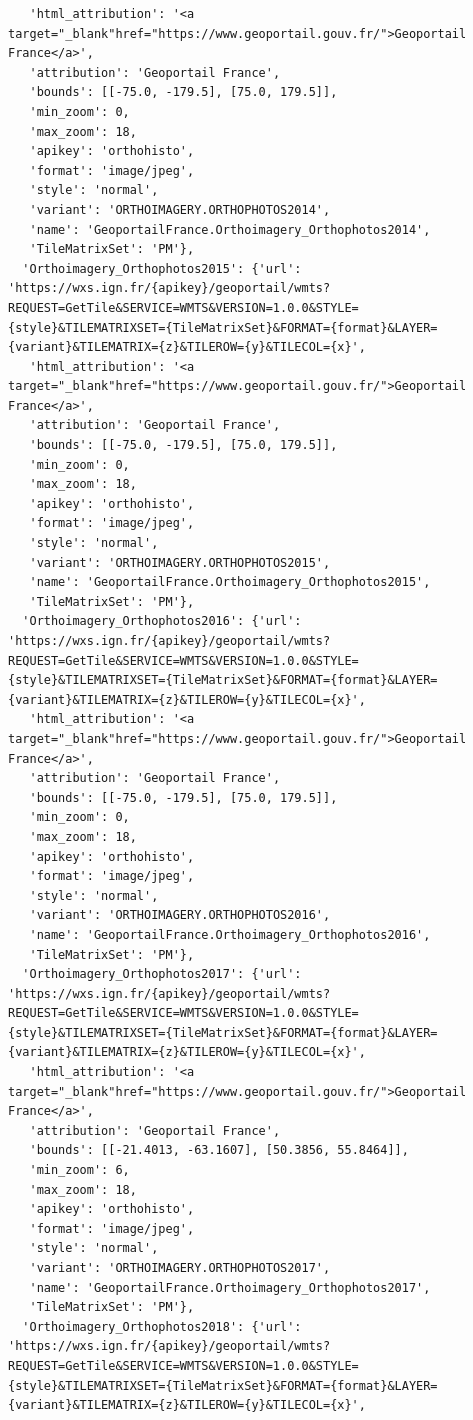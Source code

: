 \documentclass[
  letterpaper,
  DIV=11,
  numbers=noendperiod]{scrreprt}
\begin{document}
\begin{verbatim}
   'html_attribution': '<a target="_blank"href="https://www.geoportail.gouv.fr/">Geoportail France</a>',
   'attribution': 'Geoportail France',
   'bounds': [[-75.0, -179.5], [75.0, 179.5]],
   'min_zoom': 0,
   'max_zoom': 18,
   'apikey': 'orthohisto',
   'format': 'image/jpeg',
   'style': 'normal',
   'variant': 'ORTHOIMAGERY.ORTHOPHOTOS2014',
   'name': 'GeoportailFrance.Orthoimagery_Orthophotos2014',
   'TileMatrixSet': 'PM'},
  'Orthoimagery_Orthophotos2015': {'url': 'https://wxs.ign.fr/{apikey}/geoportail/wmts?REQUEST=GetTile&SERVICE=WMTS&VERSION=1.0.0&STYLE={style}&TILEMATRIXSET={TileMatrixSet}&FORMAT={format}&LAYER={variant}&TILEMATRIX={z}&TILEROW={y}&TILECOL={x}',
   'html_attribution': '<a target="_blank"href="https://www.geoportail.gouv.fr/">Geoportail France</a>',
   'attribution': 'Geoportail France',
   'bounds': [[-75.0, -179.5], [75.0, 179.5]],
   'min_zoom': 0,
   'max_zoom': 18,
   'apikey': 'orthohisto',
   'format': 'image/jpeg',
   'style': 'normal',
   'variant': 'ORTHOIMAGERY.ORTHOPHOTOS2015',
   'name': 'GeoportailFrance.Orthoimagery_Orthophotos2015',
   'TileMatrixSet': 'PM'},
  'Orthoimagery_Orthophotos2016': {'url': 'https://wxs.ign.fr/{apikey}/geoportail/wmts?REQUEST=GetTile&SERVICE=WMTS&VERSION=1.0.0&STYLE={style}&TILEMATRIXSET={TileMatrixSet}&FORMAT={format}&LAYER={variant}&TILEMATRIX={z}&TILEROW={y}&TILECOL={x}',
   'html_attribution': '<a target="_blank"href="https://www.geoportail.gouv.fr/">Geoportail France</a>',
   'attribution': 'Geoportail France',
   'bounds': [[-75.0, -179.5], [75.0, 179.5]],
   'min_zoom': 0,
   'max_zoom': 18,
   'apikey': 'orthohisto',
   'format': 'image/jpeg',
   'style': 'normal',
   'variant': 'ORTHOIMAGERY.ORTHOPHOTOS2016',
   'name': 'GeoportailFrance.Orthoimagery_Orthophotos2016',
   'TileMatrixSet': 'PM'},
  'Orthoimagery_Orthophotos2017': {'url': 'https://wxs.ign.fr/{apikey}/geoportail/wmts?REQUEST=GetTile&SERVICE=WMTS&VERSION=1.0.0&STYLE={style}&TILEMATRIXSET={TileMatrixSet}&FORMAT={format}&LAYER={variant}&TILEMATRIX={z}&TILEROW={y}&TILECOL={x}',
   'html_attribution': '<a target="_blank"href="https://www.geoportail.gouv.fr/">Geoportail France</a>',
   'attribution': 'Geoportail France',
   'bounds': [[-21.4013, -63.1607], [50.3856, 55.8464]],
   'min_zoom': 6,
   'max_zoom': 18,
   'apikey': 'orthohisto',
   'format': 'image/jpeg',
   'style': 'normal',
   'variant': 'ORTHOIMAGERY.ORTHOPHOTOS2017',
   'name': 'GeoportailFrance.Orthoimagery_Orthophotos2017',
   'TileMatrixSet': 'PM'},
  'Orthoimagery_Orthophotos2018': {'url': 'https://wxs.ign.fr/{apikey}/geoportail/wmts?REQUEST=GetTile&SERVICE=WMTS&VERSION=1.0.0&STYLE={style}&TILEMATRIXSET={TileMatrixSet}&FORMAT={format}&LAYER={variant}&TILEMATRIX={z}&TILEROW={y}&TILECOL={x}',

\end{verbatim}
\end{document}
